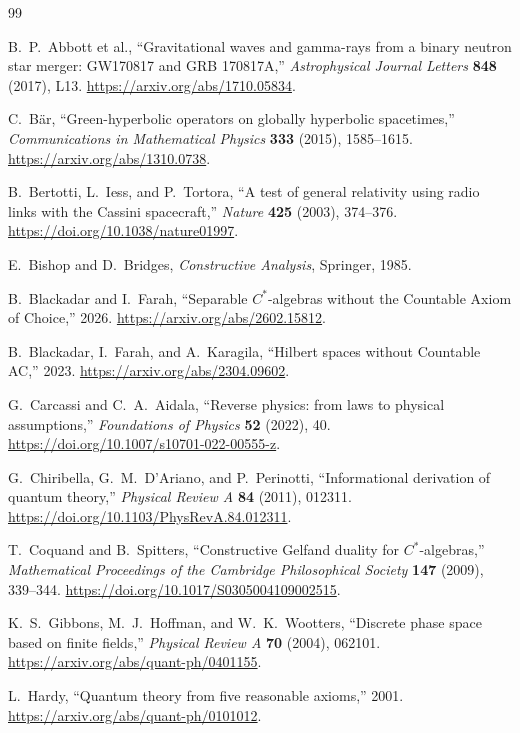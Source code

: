 \documentclass[11pt]{article}
\theoremstyle{definition}
\theoremstyle{remark}
\begin{document}
\begin{thebibliography}{99}

B.~P.~Abbott et al.,
``Gravitational waves and gamma-rays from a binary neutron star merger:
GW170817 and GRB 170817A,''
\emph{Astrophysical Journal Letters} \textbf{848} (2017), L13.
\url{https://arxiv.org/abs/1710.05834}.

C.~Bär,
``Green-hyperbolic operators on globally hyperbolic spacetimes,''
\emph{Communications in Mathematical Physics} \textbf{333} (2015), 1585--1615.
\url{https://arxiv.org/abs/1310.0738}.

B.~Bertotti, L.~Iess, and P.~Tortora,
``A test of general relativity using radio links with the Cassini spacecraft,''
\emph{Nature} \textbf{425} (2003), 374--376.
\url{https://doi.org/10.1038/nature01997}.

E.~Bishop and D.~Bridges,
\emph{Constructive Analysis}, Springer, 1985.

B.~Blackadar and I.~Farah,
``Separable \(C^*\)-algebras without the Countable Axiom of Choice,'' 2026.
\url{https://arxiv.org/abs/2602.15812}.

B.~Blackadar, I.~Farah, and A.~Karagila,
``Hilbert spaces without Countable AC,'' 2023.
\url{https://arxiv.org/abs/2304.09602}.

G.~Carcassi and C.~A.~Aidala,
``Reverse physics: from laws to physical assumptions,''
\emph{Foundations of Physics} \textbf{52} (2022), 40.
\url{https://doi.org/10.1007/s10701-022-00555-z}.

G.~Chiribella, G.~M.~D'Ariano, and P.~Perinotti,
``Informational derivation of quantum theory,''
\emph{Physical Review A} \textbf{84} (2011), 012311.
\url{https://doi.org/10.1103/PhysRevA.84.012311}.

T.~Coquand and B.~Spitters,
``Constructive Gelfand duality for \(C^*\)-algebras,''
\emph{Mathematical Proceedings of the Cambridge Philosophical Society}
\textbf{147} (2009), 339--344.
\url{https://doi.org/10.1017/S0305004109002515}.

K.~S.~Gibbons, M.~J.~Hoffman, and W.~K.~Wootters,
``Discrete phase space based on finite fields,''
\emph{Physical Review A} \textbf{70} (2004), 062101.
\url{https://arxiv.org/abs/quant-ph/0401155}.

L.~Hardy,
``Quantum theory from five reasonable axioms,'' 2001.
\url{https://arxiv.org/abs/quant-ph/0101012}.


\end{thebibliography}
\end{document}

